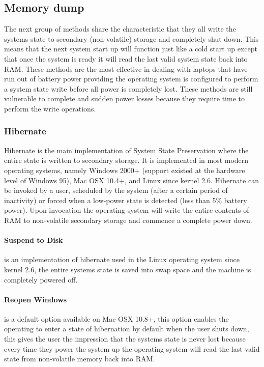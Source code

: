 \documentclass[a4paper,12pt]{article}
\begin{document}
\subsection{Memory dump}\label{sec:memorydump}
The next group of methods share the characteristic that they all write the systems state to secondary (non-volatile) storage and completely shut down. This means that the next system start up will function just like a cold start up except that once the system is ready it will read the last valid system state back into RAM.
These methods are the most effective in dealing with laptops that have run out of battery power providing the operating system is configured to perform a system state write before all power is completely lost. These methods are still vulnerable to complete and sudden power losses because they require time to perform the write operations.

\subsubsection{Hibernate}\label{sec:hibernate}
Hibernate is the main implementation of System State Preservation where the entire state is written to secondary storage. It is implemented in most modern operating systems, namely Windows 2000+ (support existed at the hardware level of Windows 95), Mac OSX 10.4+, and Linux since kernel 2.6.
Hibernate can be invoked by a user, scheduled by the system (after a certain period of inactivity) or forced when a low-power state is detected (less than 5\% battery power). Upon invocation the operating system will write the entire contents of RAM to non-volatile secondary storage and commence a complete power down.
\paragraph{Suspend to Disk}\label{sec:stDisk} is an implementation of hibernate used in the Linux operating system since kernel 2.6, the entire systems state is saved into swap space and the machine is completely powered off\citep{Wiki}.
\paragraph{Reopen Windows}\label{sec:reopen}
is a default option available on Mac OSX 10.8+, this option enables the operating to enter a state of hibernation by default when the user shuts down, this gives the user the impression that the systems state is never lost because every time they power the system up the operating system will read the last valid state from non-volatile memory back into RAM.
\end{document}
